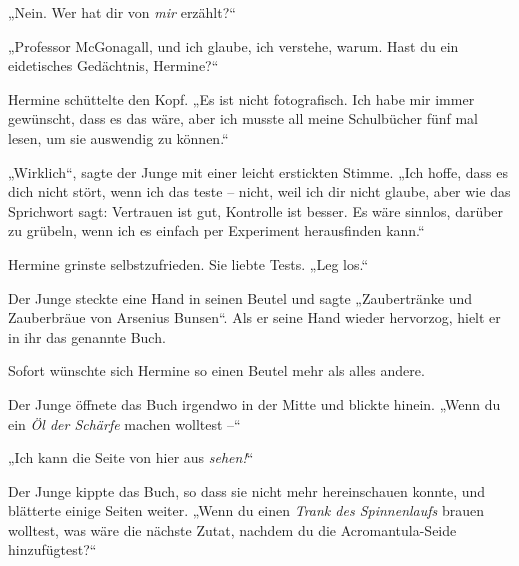 „Nein. Wer hat dir von \emph{mir} erzählt?“

„Professor McGonagall, und ich glaube, ich verstehe, warum. Hast du ein eidetisches Gedächtnis, Hermine?“

Hermine schüttelte den Kopf. „Es ist nicht fotografisch. Ich habe mir immer gewünscht, dass es das wäre, aber ich musste all meine Schulbücher fünf mal lesen, um sie auswendig zu können.“

„Wirklich“, sagte der Junge mit einer leicht erstickten Stimme. „Ich hoffe, dass es dich nicht stört, wenn ich das teste – nicht, weil ich dir nicht glaube, aber wie das Sprichwort sagt: Vertrauen ist gut, Kontrolle ist besser. Es wäre sinnlos, darüber zu grübeln, wenn ich es einfach per Experiment herausfinden kann.“

Hermine grinste selbstzufrieden. Sie liebte Tests. „Leg los.“

Der Junge steckte eine Hand in seinen Beutel und sagte „Zaubertränke und Zauberbräue von Arsenius Bunsen“. Als er seine Hand wieder hervorzog, hielt er in ihr das genannte Buch.

Sofort wünschte sich Hermine so einen Beutel mehr als alles andere.

Der Junge öffnete das Buch irgendwo in der Mitte und blickte hinein. „Wenn du ein \emph{Öl der Schärfe} machen wolltest –“

„Ich kann die Seite von hier aus \emph{sehen!}“

Der Junge kippte das Buch, so dass sie nicht mehr hereinschauen konnte, und blätterte einige Seiten weiter. „Wenn du einen \emph{Trank des Spinnenlaufs} brauen wolltest, was wäre die nächste Zutat, nachdem du die Acromantula-Seide hinzufügtest?“

